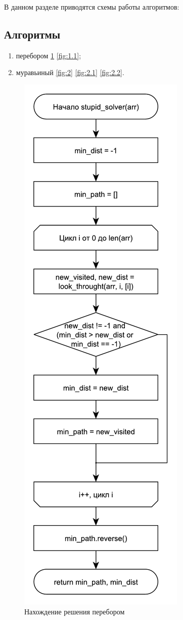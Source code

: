 \documentclass[main.tex]{subfiles}
\begin{document}
	
	В данном разделе приводятся схемы работы алгоритмов:
	
\subsection{Алгоритмы}
	
	\begin{enumerate}[1)]
		\item перебором \ref{fig:1} \ref{fig:1.1};
		\item муравьиный \ref{fig:2} \ref{fig:2.1} \ref{fig:2.2}. 
	\end{enumerate}

	\begin{figure}[H]
		\centering
		\includegraphics[scale=0.5]{src/img/1}
		\caption{Нахождение решения перебором}
		\label{fig:1}
	\end{figure}
	
\end{document}
